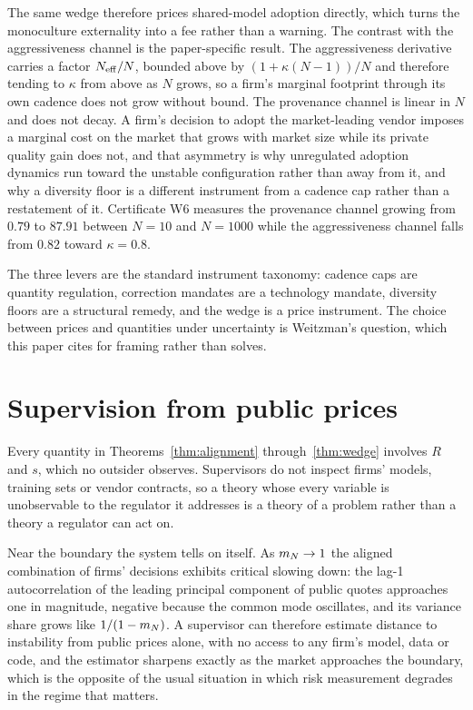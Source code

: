 The same wedge therefore prices shared-model adoption directly, which turns the monoculture externality into a fee rather than a warning. The contrast with the aggressiveness channel is the paper-specific result. The aggressiveness derivative carries a factor $N_{\mathrm{eff}}/N$, bounded above by $(1+\kappa(N-1))/N$ and therefore tending to $\kappa$ from above as $N$ grows, so a firm's marginal footprint through its own cadence does not grow without bound. The provenance channel is linear in $N$ and does not decay. A firm's decision to adopt the market-leading vendor imposes a marginal cost on the market that grows with market size while its private quality gain does not, and that asymmetry is why unregulated adoption dynamics run toward the unstable configuration rather than away from it, and why a diversity floor is a different instrument from a cadence cap rather than a restatement of it. Certificate W6 measures the provenance channel growing from $0.79$ to $87.91$ between $N=10$ and $N=1000$ while the aggressiveness channel falls from $0.82$ toward $\kappa = 0.8$.

The three levers are the standard instrument taxonomy: cadence caps are quantity regulation, correction mandates are a technology mandate, diversity floors are a structural remedy, and the wedge is a price instrument. The choice between prices and quantities under uncertainty is Weitzman's question, which this paper cites for framing rather than solves.

\section{Supervision from public prices}
\label{app:supervision}

Every quantity in Theorems~\ref{thm:alignment} through~\ref{thm:wedge} involves $R$ and $s$, which no outsider observes. Supervisors do not inspect firms' models, training sets or vendor contracts, so a theory whose every variable is unobservable to the regulator it addresses is a theory of a problem rather than a theory a regulator can act on.

Near the boundary the system tells on itself. As $m_N \to 1$ the aligned combination of firms' decisions exhibits critical slowing down: the lag-1 autocorrelation of the leading principal component of public quotes approaches one in magnitude, negative because the common mode oscillates, and its variance share grows like $1/(1-m_N)$. A supervisor can therefore estimate distance to instability from public prices alone, with no access to any firm's model, data or code, and the estimator sharpens exactly as the market approaches the boundary, which is the opposite of the usual situation in which risk measurement degrades in the regime that matters.

